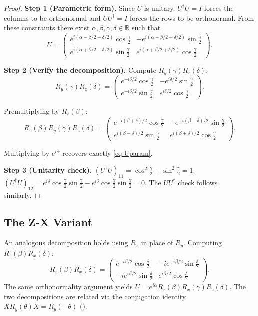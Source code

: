 \documentclass[12pt, a4paper, oneside]{report}
\theoremstyle{plain}
\theoremstyle{definition}
\theoremstyle{remark}
\newcommand{\RR}{\mathbb{R}}
\newcommand{\Rx}{R_x}
\newcommand{\Ry}{R_y}
\newcommand{\Rz}{R_z}
\begin{document}
\begin{proof}
	\textbf{Step 1 (Parametric form).}
	Since $U$ is unitary, $U^\dagger U = I$ forces the columns to be orthonormal and
	$UU^\dagger = I$ forces the rows to be orthonormal. From these constraints there exist
	$\alpha, \beta, \gamma, \delta \in \RR$ such that
	\begin{equation}\label{eq:Uparam}
		U = \begin{pmatrix}
			e^{i(\alpha - \beta/2 - \delta/2)}\cos\frac{\gamma}{2} &
			-e^{i(\alpha - \beta/2 + \delta/2)}\sin\frac{\gamma}{2}  \\[4pt]
			e^{i(\alpha + \beta/2 - \delta/2)}\sin\frac{\gamma}{2} &
			e^{i(\alpha + \beta/2 + \delta/2)}\cos\frac{\gamma}{2}
		\end{pmatrix}.
	\end{equation}

	\textbf{Step 2 (Verify the decomposition).}
	Compute $\Ry(\gamma)\Rz(\delta)$:
	\[
		\Ry(\gamma)\Rz(\delta)
		= \begin{pmatrix}
			e^{-i\delta/2}\cos\frac{\gamma}{2} & -e^{i\delta/2}\sin\frac{\gamma}{2} \\
			e^{-i\delta/2}\sin\frac{\gamma}{2} & e^{i\delta/2}\cos\frac{\gamma}{2}
		\end{pmatrix}.
	\]

	Premultiplying by $\Rz(\beta)$:
	\[
		\Rz(\beta)\Ry(\gamma)\Rz(\delta)
		= \begin{pmatrix}
			e^{-i(\beta+\delta)/2}\cos\frac{\gamma}{2} & -e^{-i(\beta-\delta)/2}\sin\frac{\gamma}{2} \\
			e^{i(\beta-\delta)/2}\sin\frac{\gamma}{2}  & e^{i(\beta+\delta)/2}\cos\frac{\gamma}{2}
		\end{pmatrix}.
	\]

	Multiplying by $e^{i\alpha}$ recovers exactly \cref{eq:Uparam}.

	\textbf{Step 3 (Unitarity check).}
	$(U^\dagger U)_{11} = \cos^2\!\frac{\gamma}{2}+\sin^2\!\frac{\gamma}{2} = 1$.
	$(U^\dagger U)_{12} = e^{i\delta}\cos\frac{\gamma}{2}\sin\frac{\gamma}{2}
		- e^{i\delta}\cos\frac{\gamma}{2}\sin\frac{\gamma}{2} = 0$.
	The $UU^\dagger$ check follows similarly.
\end{proof}

\subsection{The Z-X Variant}
\label{subsec:zy-xvar}

An analogous decomposition holds using $\Rx$ in place of $\Ry$. Computing $\Rz(\beta)\Rx(\delta)$:
\[
	\Rz(\beta)\Rx(\delta)
	= \begin{pmatrix}
		e^{-i\beta/2}\cos\frac{\delta}{2}  & -ie^{-i\beta/2}\sin\frac{\delta}{2} \\
		-ie^{i\beta/2}\sin\frac{\delta}{2} & e^{i\beta/2}\cos\frac{\delta}{2}
	\end{pmatrix}.
\]
The same orthonormality argument yields $U = e^{i\alpha}\Rz(\beta)\Rx(\gamma)\Rz(\delta)$.
The two decompositions are related via the conjugation identity $X\Ry(\theta)X = \Ry(-\theta)$
().
\end{document}
